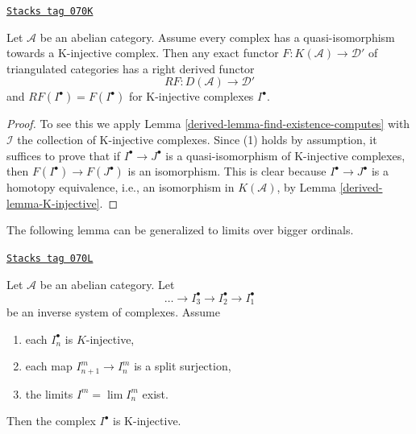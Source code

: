 \begin{lemma}
\label{derived-lemma-enough-K-injectives-implies}
\href{https://stacks.math.columbia.edu/tag/070K}{\texttt{Stacks tag 070K}}

Let $\mathcal{A}$ be an abelian category.
Assume every complex has a quasi-isomorphism towards a K-injective complex.
Then any exact functor $F : K(\mathcal{A}) \to \mathcal{D}'$ of triangulated
categories has a right derived functor
$$
RF : D(\mathcal{A}) \longrightarrow \mathcal{D}'
$$
and $RF(I^\bullet) = F(I^\bullet)$ for K-injective complexes $I^\bullet$.
\end{lemma}

\begin{proof}

To see this we apply
Lemma \ref{derived-lemma-find-existence-computes}
with $\mathcal{I}$ the collection of K-injective complexes. Since (1)
holds by assumption, it suffices to prove that if $I^\bullet \to J^\bullet$
is a quasi-isomorphism of K-injective complexes, then
$F(I^\bullet) \to F(J^\bullet)$ is an isomorphism. This is clear because
$I^\bullet \to J^\bullet$ is a homotopy equivalence, i.e., an
isomorphism in $K(\mathcal{A})$, by
Lemma \ref{derived-lemma-K-injective}.
\end{proof}

The following lemma can be generalized to limits over bigger ordinals.

\begin{lemma}
\label{derived-lemma-limit-K-injectives}
\href{https://stacks.math.columbia.edu/tag/070L}{\texttt{Stacks tag 070L}}


Let $\mathcal{A}$ be an abelian category. Let
$$
\ldots \to I_3^\bullet \to I_2^\bullet \to I_1^\bullet
$$
be an inverse system of complexes. Assume
\begin{enumerate}
\item each $I_n^\bullet$ is $K$-injective,
\item each map $I_{n + 1}^m \to I_n^m$ is a split surjection,
\item the limits $I^m = \lim I_n^m$ exist.
\end{enumerate}
Then the complex $I^\bullet$ is K-injective.
\end{lemma}

